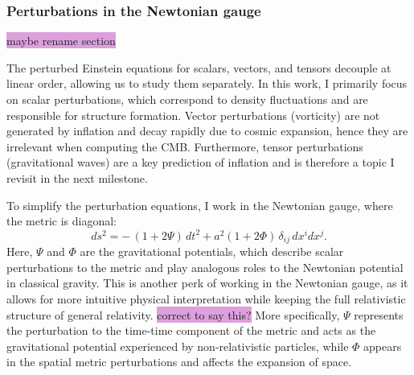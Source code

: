 \documentclass{aa}
\numberwithin{equation}{section}
\numberwithin{table}{section}
\numberwithin{figure}{section}
\begin{document}


\subsubsection{Perturbations in the Newtonian gauge}
\colorbox{Plum}{maybe rename section}

The perturbed Einstein equations for scalars, vectors, and tensors decouple at linear order, allowing us to study them separately. 
In this work, I primarily focus on scalar perturbations, 
which correspond to density fluctuations and are responsible for structure formation. Vector perturbations (vorticity) are not generated by inflation and decay rapidly due to cosmic expansion, hence they are irrelevant when computing the CMB. Furthermore, tensor perturbations (gravitational waves) are a key prediction of inflation and is therefore a topic I revisit in the next milestone. 

To simplify the perturbation equations, I work in the Newtonian gauge, where the metric is diagonal:
\begin{equation}
ds^2 = - \,(1 + 2\Psi)\,dt^2 + a^2 (1 + 2\Phi)\, \delta_{ij}\, dx^i dx^j.
\end{equation}
Here, $\Psi$ and $\Phi$ are the gravitational potentials, which describe scalar perturbations to the metric and play analogous roles to the Newtonian potential in classical gravity. This is another perk of working in the Newtonian gauge, as it allows for more intuitive physical interpretation while keeping the full relativistic structure of general relativity. \colorbox{Plum}{correct to say this?} More specifically, $\Psi$ represents the perturbation to the time-time component of the metric and acts as the gravitational potential experienced by non-relativistic particles, while $\Phi$ appears in the spatial metric perturbations and affects the expansion of space. 

\end{document}
